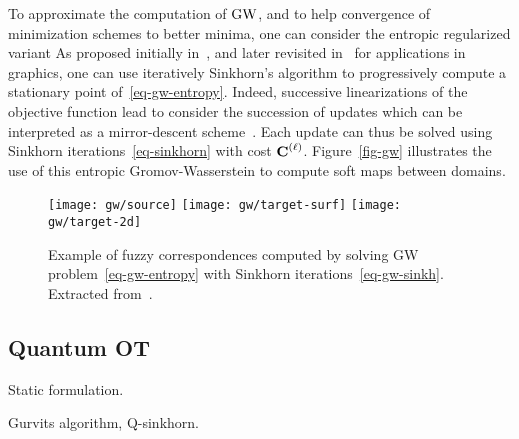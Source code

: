 To approximate the computation of $\operatorname{\mathrm{GW}}$, and to help convergence of minimization schemes to better minima, one can consider the entropic regularized variant
As proposed initially in~\cite{gold-1996,rangarajan-1999}, and later revisited in~\cite{2016-solomon-gw} for applications in graphics, one can use iteratively Sinkhorn's algorithm to progressively compute a stationary point of~\eqref{eq-gw-entropy}. 
%
Indeed, successive linearizations of the objective function lead to consider the succession of updates
\eql{\label{eq-gw-sinkh}
	\itt{\P} \eqdef \umin{ \P \in \CouplingsD(\a,\b) } \dotp{\P}{\it{\C}} - \epsilon\H(\P)
		\qwhereq
}
which can be interpreted as a mirror-descent scheme~\cite{2016-solomon-gw}. Each update can thus be solved using Sinkhorn iterations~\eqref{eq-sinkhorn} with cost $\mathrm{\textbf{\upshape C}}^{(\ell)}$. Figure~\eqref{fig-gw} illustrates the use of this entropic Gromov-Wasserstein to compute soft maps between domains. 


\begin{figure}
\centering
\texttt{[image: gw/source]}
\texttt{[image: gw/target-surf]}
\texttt{[image: gw/target-2d]}
\caption{\label{fig-gw}
Example of fuzzy correspondences computed by solving GW problem~\eqref{eq-gw-entropy} with Sinkhorn iterations~\eqref{eq-gw-sinkh}. Extracted from~\cite{2016-solomon-gw}.
}
\end{figure}


\subsection{Quantum OT}

Static formulation.

Gurvits algorithm, Q-sinkhorn.